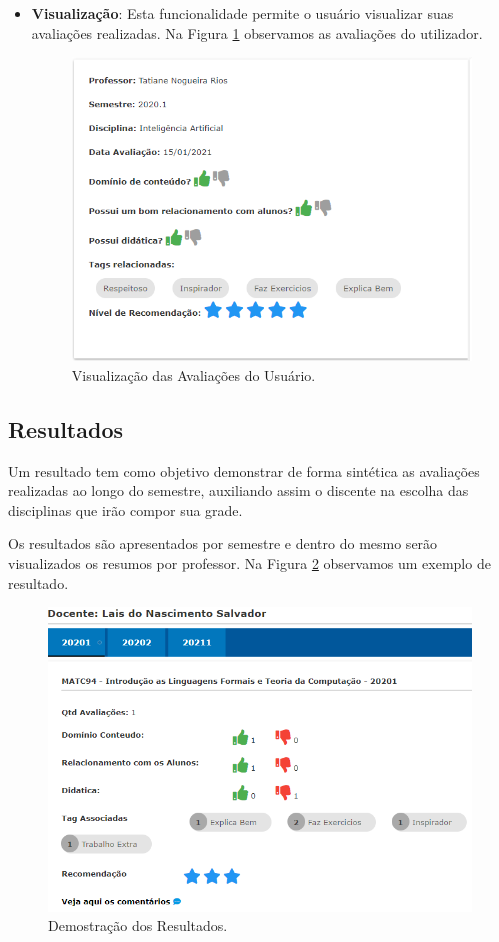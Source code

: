 \documentclass[12pt, a4paper]{report}
\begin{document}
\begin{itemize}
\item \textbf{Visualização}: Esta funcionalidade permite o usuário visualizar suas avaliações realizadas. Na Figura \ref{fig:visualizacao_minha_avaliacao} observamos as avaliações do utilizador.

\begin{figure}
\centering
\includegraphics[scale=0.7]{visualizacao_minha_avaliacao.png}
\caption{Visualização das Avaliações do Usuário.}
\label{fig:visualizacao_minha_avaliacao}
\end{figure}

\end{itemize}
\subsection{Resultados}
Um resultado tem como objetivo demonstrar de forma sintética as avaliações realizadas ao longo do semestre, auxiliando assim o discente na escolha das disciplinas que irão compor sua  grade.

Os resultados são apresentados por semestre e dentro do mesmo serão visualizados os resumos por professor. Na Figura \ref{fig:resultados} observamos um exemplo de resultado.

\begin{figure}
\centering
\includegraphics[scale=0.7]{resultados.png}
\caption{Demostração dos Resultados.}
\label{fig:resultados}
\end{figure}
\end{document}
